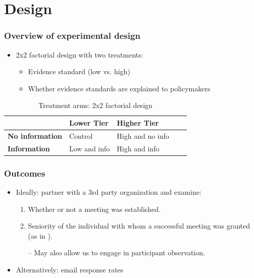 \documentclass[usenames,dvipsnames]{beamer}
\begin{document}

\section{Design}

\begin{frame}
\frametitle{Overview of experimental design}

\begin{itemize}
\item 2x2 factorial design with two treatments:
\begin{itemize}
\item Evidence standard (low vs. high)
\item Whether evidence standards are explained to policymakers
\end{itemize}
\end{itemize}

\begin{table}[H]
\centering
\caption{Treatment arms: 2x2 factorial design}
\vspace{-7mm}
\label{tab: arms} 
\bigbreak
\begin{tabular}{|l|l|l|l|l|}
\hline
& \textbf{Lower Tier} & \textbf{Higher Tier} \\ \hline
\textbf{No information} & Control & High and no info \\ \hline
\textbf{Information} & Low and info & High and info \\ \hline
\end{tabular}
\end{table}

\end{frame}


\begin{frame}
\frametitle{Outcomes}

\begin{itemize}
\item Ideally: partner with a \textcolor{Cerulean}{3rd party organization} and examine: 
\begin{enumerate} 
\item Whether or not a \textcolor{Cerulean}{meeting was established}.
\item Seniority of the individual with whom a successful meeting was granted (as in \citet{kalla2016campaign}).
\pause
\item [--] May also allow us to engage in participant observation.
\end{enumerate}
\pause
\vspace{1cm}
\item Alternatively: \textcolor{Cerulean}{email response rates}
\end{itemize}

\end{frame}
\end{document}
